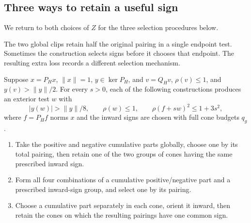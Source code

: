 \subsection{Three ways to retain a useful sign}\label{clip:selection}

We return to both choices of $Z$ for the three selection procedures below.

The two global clips retain half the original pairing in a single
endpoint test. Sometimes the construction selects signs before it
chooses that endpoint. The resulting extra loss records a different
selection mechanism.

\begin{proposition}\label{clip:selection-prop}
Suppose $x=P_Hx$, $\|x\|=1$, $y\in\ker P_H$, and
$v=Q_Hv$, $\rho(v)\le1$, and $y(v)>\|y\|/2$.
For every $s>0$, each of
the following constructions produces an exterior test $w$ with
\[
 |y(w)|>\|y\|/8,\qquad \rho(w)\le1,
 \qquad \rho(f+sw)^2\le1+3s^2,
\]
where $f=P_Hf$ norms $x$ and the inward signs are chosen with full
cone budgets $q_g$.

\begin{enumerate}
\item Take the positive and negative cumulative parts globally, choose
one by its total pairing, then retain one of the two groups of cones
having the same prescribed inward sign.
\item Form all four combinations of a cumulative positive/negative
part and a prescribed inward-sign group, and select one by its pairing.
\item Choose a cumulative part separately in each cone, orient it
inward, then retain the cones on which the resulting pairings have
one common sign.
\end{enumerate}
\end{proposition}
